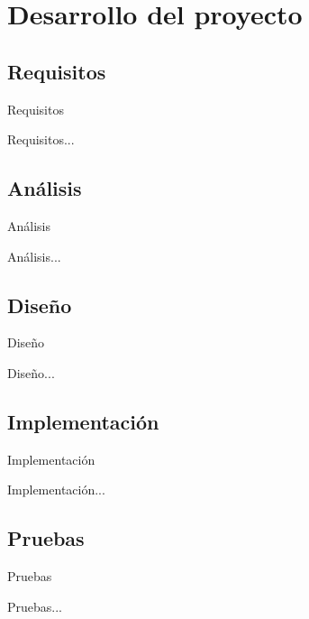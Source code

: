 \documentclass[spanish,xcolor=table,svgnames]{beamer}
\begin{document}
\section{Desarrollo del proyecto}

\subsection*{Requisitos}
\begin{frame}{Requisitos}
  \begin{block}{Requisitos...}

  \end{block}
\end{frame}


\subsection*{Análisis}
\begin{frame}{Análisis}
  \begin{block}{Análisis...}

  \end{block}
\end{frame}

\subsection*{Diseño}
\begin{frame}{Diseño}
  \begin{block}{Diseño...}

  \end{block}
\end{frame}

\subsection*{Implementación}
\begin{frame}{Implementación}
  \begin{block}{Implementación...}

  \end{block}
\end{frame}

\subsection*{Pruebas}
\begin{frame}{Pruebas}
  \begin{block}{Pruebas...}

  \end{block}
\end{frame}
\end{document}
